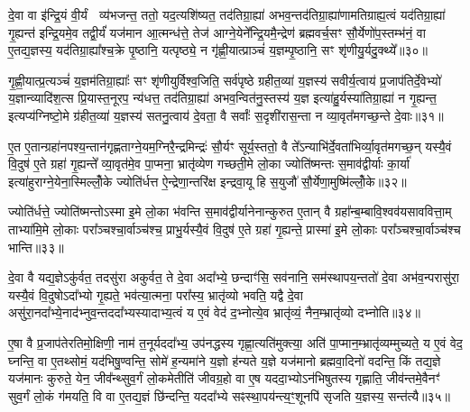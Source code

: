 {\anuvakamend[{अव॑ दाधार मि॒त्रेणै॒व प्री॑णाति॒ षट्च॑॥७॥}]}

दे॒वा वा इ॑न्द्रि॒यं वी॒र्यं  व्य॑भजन्त॒ ततो॒ यद॒त्यशि॑ष्यत॒ तद॑तिग्रा॒ह्या॑ अभव॒न्तद॑तिग्रा॒ह्या॑णामतिग्राह्य॒त्वं यद॑तिग्रा॒ह्या॑ गृ॒ह्यन्त॑ इन्द्रि॒यमे॒व तद्वी॒र्यं॑ यज॑मान आ॒त्मन्ध॑त्ते॒ तेज॑ आग्ने॒येने᳚न्द्रि॒यमै॒न्द्रेण॑ ब्रह्मवर्च॒सꣳ सौ॒र्येणो॑प॒स्तम्भ॑नं॒ वा ए॒तद्य॒ज्ञस्य॒ यद॑तिग्रा॒ह्या᳚श्च॒क्रे पृ॒ष्ठानि॒ यत्पृष्ठ्ये॒ न गृ॑ह्णी॒यात्प्राञ्चं॑ य॒ज्ञम्पृ॒ष्ठानि॒ सꣳ शृ॑णीयु॒र्यदु॒क्थ्ये᳚॥३०॥

गृ॒ह्णी॒यात्प्र॒त्यञ्चं॑ य॒ज्ञम॑तिग्रा॒ह्याः᳚ सꣳ शृ॑णीयुर्विश्व॒जिति॒ सर्व॑पृष्ठे ग्रहीत॒व्या॑ य॒ज्ञस्य॑ सवीर्य॒त्वाय॑ प्र॒जाप॑तिर्दे॒वेभ्यो॑ य॒ज्ञान्व्यादि॑श॒त्स प्रि॒यास्त॒नूरप॒ न्य॑धत्त॒ तद॑तिग्रा॒ह्या॑ अभव॒न्वित॑नु॒स्तस्य॑ य॒ज्ञ इत्या॑हु॒र्यस्या॑तिग्रा॒ह्या॑ न गृ॒ह्यन्त॒ इत्यप्य॑ग्निष्टो॒मे ग्र॑हीत॒व्या॑ य॒ज्ञस्य॑ सतनु॒त्वाय॑ दे॒वता॒ वै सर्वाः᳚ स॒दृशी॑रास॒न्ता न व्या॒वृत᳚मगच्छ॒न्ते दे॒वाः॥३१॥

ए॒त ए॒तान्ग्रहा॑नपश्य॒न्तान॑गृह्णताग्ने॒यम॒ग्निरै॒न्द्रमिन्द्रः॑ सौ॒र्यꣳ सूर्य॒स्ततो॒ वै ते᳚\-ऽन्याभि॑र्दे॒वता॑भिर्व्या॒वृत॑मगच्छ॒न् यस्यै॒वं वि॒दुष॑ ए॒ते ग्रहा॑ गृ॒ह्यन्ते᳚ व्या॒वृत॑मे॒व पा॒प्मना॒ भ्रातृ॑व्येण गच्छती॒मे लो॒का ज्योति॑ष्मन्तः स॒माव॑द्वीर्याः का॒र्या॑ इत्या॑हुराग्ने॒येना॒स्मिल्लोँ॒के ज्योति॑र्धत्त ऐ॒न्द्रेणा॒न्तरि॑क्ष इन्द्रवा॒यू हि स॒युजौ॑ सौ॒र्येणा॒मुष्मि॑ल्लोँ॒के॥३२॥

ज्योति॑र्धत्ते॒ ज्योति॑ष्मन्तो\-ऽस्मा इ॒मे लो॒का भ॑वन्ति स॒माव॑द्वीर्यानेनान्कुरुत ए॒तान् वै ग्रहा᳚न्ब॒म्बावि॒श्वव॑यसाववित्ता॒म् ताभ्या॑मि॒मे लो॒काः परा᳚ञ्चश्चा॒र्वाञ्च॑श्च॒ प्राभु॒र्यस्यै॒वं वि॒दुष॑ ए॒ते ग्रहा॑ गृ॒ह्यन्ते॒ प्रास्मा॑ इ॒मे लो॒काः परा᳚ञ्चश्चा॒र्वाञ्च॑श्च भान्ति॥३३॥

{\anuvakamend[{उ॒क्थ्ये॑ दे॒वा अ॒मुष्मि॑ल्लोँ॒क एका॒न्नच॑त्वारि॒ꣳ॒शच्च॑॥८॥}]}

दे॒वा वै यद्य॒ज्ञे\-ऽकु॑र्वत॒ तदसु॑रा अकुर्वत॒ ते दे॒वा अदा᳚भ्ये॒ छन्दाꣳ॑सि॒ सव॑नानि॒ सम॑स्थापय॒न्ततो॑ दे॒वा अभ॑व॒न्परासु॑रा॒ यस्यै॒वं वि॒दुषो\-ऽदा᳚भ्यो गृ॒ह्यते॒ भव॑त्या॒त्मना॒ परा᳚स्य॒ भ्रातृ॑व्यो भवति॒ यद्वै दे॒वा असु॑रा॒नदा᳚भ्ये॒ना\-द॑भ्नुव॒न्तददा᳚भ्यस्यादाभ्य॒त्वं य ए॒वं वेद॑ द॒भ्नोत्ये॒व भ्रातृ॑व्यं॒ नैन॒म्भ्रातृ॑व्यो दभ्नोति॥३४॥

ए॒षा वै प्र॒जाप॑तेरतिमो॒क्षिणी॒ नाम॑ त॒नूर्यददा᳚भ्य॒ उप॑नद्धस्य गृह्णा॒त्यति॑मुक्त्या॒ अति॑ पा॒प्मान॒म्भ्रातृ॑व्यम्मुच्यते॒ य ए॒वं वेद॒ घ्नन्ति॒ वा ए॒तथ्सोमं॒ यद॑भिषु॒ण्वन्ति॒ सोमे॑ ह॒न्यमा॑ने य॒ज्ञो ह॑न्यते य॒ज्ञे यज॑मानो ब्रह्मवा॒दिनो॑ वदन्ति॒ किं तद्य॒ज्ञे यज॑मानः कुरुते॒ येन॒ जीव᳚न्थ्सुव॒र्गं लो॒कमेतीति॑ जीवग्र॒हो वा ए॒ष यददा॒भ्यो\-ऽन॑भिषुतस्य गृह्णाति॒ जीव॑न्तमे॒वैनꣳ॑ सुव॒र्गं लो॒कं ग॑मयति॒ वि वा ए॒तद्य॒ज्ञं छि॑न्दन्ति॒ यददा᳚भ्ये सꣴस्था॒पय॑न्त्य॒ꣳ॒शूनपि॑ सृजति य॒ज्ञस्य॒ सन्त॑त्यै॥३५॥

